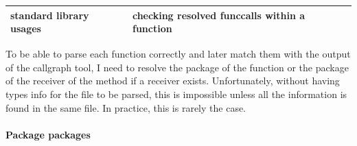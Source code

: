 \documentclass{seal_thesis}
\begin{document}
\begin{table}[H]
\begin{longtable}[c]{@{}ll@{}}
	standard library usages & checking resolved funccalls within a function \\* \bottomrule
\end{longtable}
\end{table}

\noindent To be able to parse each function correctly and later match them with the output of the callgraph tool, I need to resolve the package of the function or the package of the receiver of the method if a receiver exists. Unfortunately, without having types info for the file to be parsed, this is impossible unless all the information is found in the same file. In practice, this is rarely the case.

\paragraph{Package packages}
\end{document}
